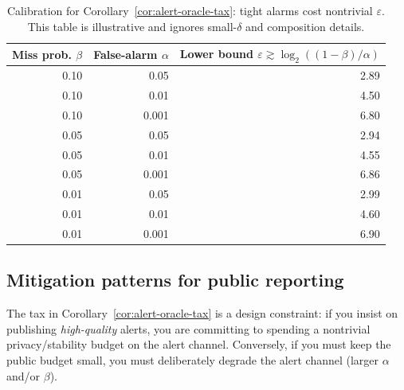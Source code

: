\documentclass[11pt]{article}
\begin{document}
\begin{table}[h]
\centering
\begin{tabular}{@{}rrr@{}}
\toprule
Miss prob. $\beta$ & False-alarm $\alpha$ & Lower bound $\varepsilon \gtrsim \log_2\!((1-\beta)/\alpha)$ \\
\midrule
0.10 & 0.05  & 2.89 \\
0.10 & 0.01  & 4.50 \\
0.10 & 0.001 & 6.80 \\
0.05 & 0.05  & 2.94 \\
0.05 & 0.01  & 4.55 \\
0.05 & 0.001 & 6.86 \\
0.01 & 0.05  & 2.99 \\
0.01 & 0.01  & 4.60 \\
0.01 & 0.001 & 6.90 \\
\bottomrule
\end{tabular}
\caption{Calibration for Corollary~\ref{cor:alert-oracle-tax}: tight alarms cost nontrivial $\varepsilon$.
This table is illustrative and ignores small-$\delta$ and composition details.
}
\label{tab:alert-tax-calibration}
\end{table}



\subsection{Mitigation patterns for public reporting}
The tax in Corollary~\ref{cor:alert-oracle-tax} is a design constraint: if you insist on publishing \emph{high-quality} alerts, you are committing to spending a nontrivial privacy/stability budget on the alert channel.
Conversely, if you must keep the public budget small, you must deliberately degrade the alert channel (larger $\alpha$ and/or $\beta$).
\end{document}
